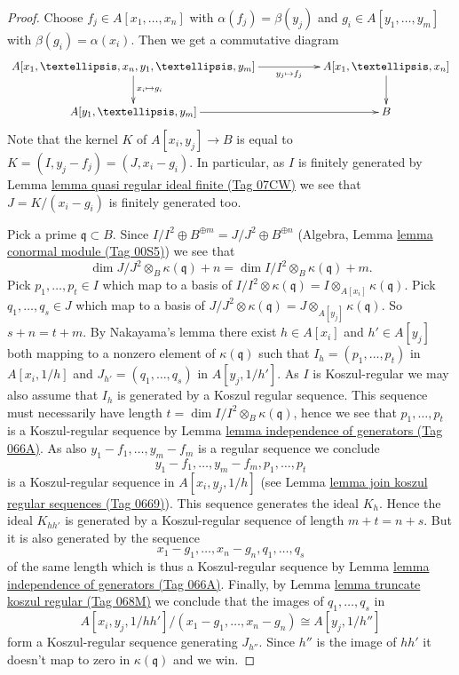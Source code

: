 \documentclass{amsart}
\theoremstyle{plain}
\theoremstyle{definition}
\theoremstyle{remark}
\numberwithin{equation}{subsection}
\begin{document}
\begin{proof}
Choose $f_j \in A[x_1, \ldots, x_n]$ with $\alpha(f_j) = \beta(y_j)$
and $g_i \in A[y_1, \ldots, y_m]$ with $\beta(g_i) = \alpha(x_i)$.
Then we get a commutative diagram
$$
\xymatrix{
A[x_1, \ldots, x_n, y_1, \ldots, y_m]
\ar[d]^{x_i \mapsto g_i} \ar[rr]_-{y_j \mapsto f_j} & &
A[x_1, \ldots, x_n] \ar[d] \\
A[y_1, \ldots, y_m] \ar[rr] & & B
}
$$
Note that the kernel $K$ of $A[x_i, y_j] \to B$ is equal to
$K = (I, y_j - f_j) = (J, x_i - g_i)$. In particular, as
$I$ is finitely generated by
Lemma \href{https://stacks.math.columbia.edu/tag/07CW}{lemma quasi regular ideal finite (Tag 07CW)}
we see that $J = K/(x_i - g_i)$ is finitely generated too.

\medskip\noindent
Pick a prime $\mathfrak q \subset B$. Since
$I/I^2 \oplus B^{\oplus m} = J/J^2 \oplus B^{\oplus n}$
(Algebra, Lemma \href{https://stacks.math.columbia.edu/tag/00S5}{lemma conormal module (Tag 00S5)})
we see that
$$
\dim J/J^2 \otimes_B \kappa(\mathfrak q) + n =
\dim I/I^2 \otimes_B \kappa(\mathfrak q) + m.
$$
Pick $p_1, \ldots, p_t \in I$ which map to a basis of
$I/I^2 \otimes \kappa(\mathfrak q) = I \otimes_{A[x_i]} \kappa(\mathfrak q)$.
Pick $q_1, \ldots, q_s \in J$ which map to a basis of
$J/J^2 \otimes \kappa(\mathfrak q) = J \otimes_{A[y_j]} \kappa(\mathfrak q)$.
So $s + n = t + m$. By Nakayama's lemma there exist $h \in A[x_i]$ and
$h' \in A[y_j]$ both mapping to a nonzero element of $\kappa(\mathfrak q)$
such that $I_h = (p_1, \ldots, p_t)$ in $A[x_i, 1/h]$ and
$J_{h'} = (q_1, \ldots, q_s)$ in $A[y_j, 1/h']$.
As $I$ is Koszul-regular we may also assume that $I_h$ is generated
by a Koszul regular sequence. This sequence must necessarily have length
$t = \dim I/I^2 \otimes_B \kappa(\mathfrak q)$, hence we see that
$p_1, \ldots, p_t$ is a Koszul-regular sequence by
Lemma \href{https://stacks.math.columbia.edu/tag/066A}{lemma independence of generators (Tag 066A)}.
As also $y_1 - f_1, \ldots, y_m - f_m$ is a regular sequence we
conclude
$$
y_1 - f_1, \ldots, y_m - f_m, p_1, \ldots, p_t
$$
is a Koszul-regular sequence in $A[x_i, y_j, 1/h]$
(see Lemma \href{https://stacks.math.columbia.edu/tag/0669}{lemma join koszul regular sequences (Tag 0669)}).
This sequence generates the ideal $K_h$. Hence the
ideal $K_{hh'}$ is generated by a Koszul-regular sequence
of length $m + t = n + s$. But it is also generated by the sequence
$$
x_1 - g_1, \ldots, x_n - g_n, q_1, \ldots, q_s
$$
of the same length which is thus a Koszul-regular sequence by
Lemma \href{https://stacks.math.columbia.edu/tag/066A}{lemma independence of generators (Tag 066A)}.
Finally, by
Lemma \href{https://stacks.math.columbia.edu/tag/068M}{lemma truncate koszul regular (Tag 068M)}
we conclude that the images of $q_1, \ldots, q_s$ in
$$
A[x_i, y_j, 1/hh']/(x_1 - g_1, \ldots, x_n - g_n)
\cong A[y_j, 1/h'']
$$
form a Koszul-regular sequence generating $J_{h''}$. Since $h''$
is the image of $hh'$ it doesn't map to zero in $\kappa(\mathfrak q)$
and we win.
\end{proof}
\end{document}
